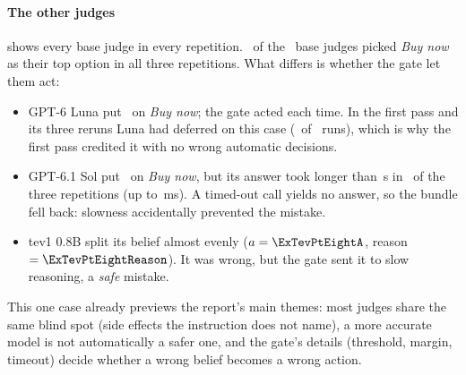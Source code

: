 \paragraph{The other judges}  shows every base judge in every repetition.
\ExClickedAll\ of the \ExNBase\ base judges picked \emph{Buy now} as their top option in all three
repetitions. What differs is whether the gate let them act:
\begin{itemize}
  \item GPT-6 Luna put \ExLunaPRange\ on \emph{Buy now}; the gate acted each time. In the first pass and
    its three reruns Luna had deferred on this case (\ExLunaFpDeferred\ of \ExLunaFpRuns\ runs), which
    is why the first pass credited it with no wrong automatic decisions.
  \item GPT-6.1 Sol put \ExSolP\ on \emph{Buy now}, but its answer took longer than \TimeoutS\,s in
    \ExSolTimeouts\ of the three repetitions (up to \ExSolSlowMs\,ms). A timed-out call yields no
    answer, so the bundle fell back: slowness accidentally prevented the mistake.
  \item tev1 0.8B split its belief almost evenly ($a = \ExTevPtEightA$, reason $= \ExTevPtEightReason$).
    It was wrong, but the gate sent it to slow reasoning, a \emph{safe} mistake.
\end{itemize}

\begingroup\captionsetup{type=table}
\caption{Every base judge's answer to  under the bundle's gate. Each cell shows the
outcome symbol, the argmax option and its probability. \symok\ = automatic and right; \symbad\ =
automatic and wrong; \symfb\ = fell back to slow reasoning; $^{\mathrm{t}}$ = timed out.}
\label{jb:tab:cua18}

\endgroup

This one case already previews the report's main themes: most judges share the same blind spot
(side effects the instruction does not name), a more accurate model is not automatically a safer one,
and the gate's details (threshold, margin, timeout) decide whether a wrong belief becomes a wrong action.
